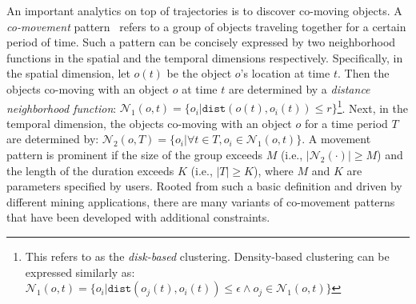 An important analytics on top of trajectories is to discover co-moving objects. A \emph{co-movement} pattern~\cite{li2013onlinegroup,zheng2015trajectory} 
refers to a group of objects traveling together for a certain period of time.
Such a pattern can be concisely expressed by two neighborhood functions in the spatial and the temporal dimensions respectively.
Specifically, in the spatial dimension, let $o(t)$ be the object $o$'s location at time $t$.
Then the objects co-moving with an object $o$
at time $t$ are determined by a 
\emph{distance neighborhood function}:
$\mathcal{N}_1(o,t) = \{o_i | \mathtt{dist}(o(t), o_i(t)) \leq r \}$\footnote{This refers to as the \emph{disk-based} clustering. Density-based clustering can be expressed similarly as: $\mathcal{N}_1(o,t) = \{o_i | \mathtt{dist}(o_j(t), o_i(t)) \leq \epsilon \wedge o_j \in \mathcal{N}_1(o,t) \}$}. Next, in the temporal dimension, the objects co-moving with an object $o$ for a time period $T$ are determined by: $\mathcal{N}_2(o, T) = \{o_i | \forall t \in T, o_i \in \mathcal{N}_1(o,t)\}$.
%
 A movement pattern is prominent if 
the size of the group exceeds $M$ (i.e., $|\mathcal{N}_2(\cdot)| \geq M$) and the length of the duration exceeds $K$ (i.e., $|T| \geq K$), 
where $M$ and $K$ are parameters specified by users. 
Rooted from such a basic definition 
and driven by different mining applications, there are many variants of co-movement patterns that have been developed with additional constraints.


